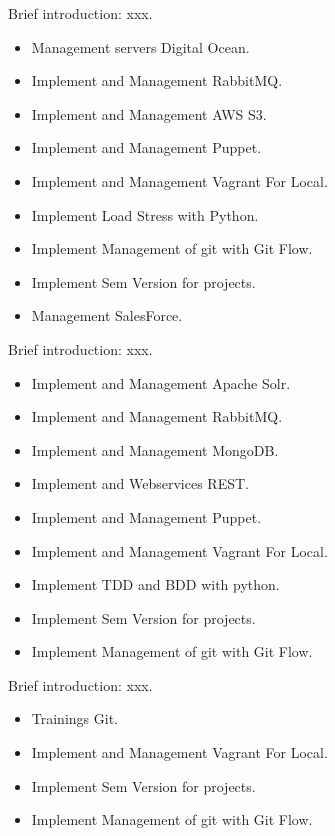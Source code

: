 \documentclass{resume}
\begin{document}
Brief introduction: xxx.
\begin{itemize}
  \item Management servers Digital Ocean.
  \item Implement and Management RabbitMQ.
  \item Implement and Management AWS S3.
  \item Implement and Management Puppet.
  \item Implement and Management Vagrant For Local.
  \item Implement Load Stress with Python.
  \item Implement Management of git with Git Flow.
  \item Implement Sem Version for projects.
  \item Management SalesForce.
\end{itemize}

Brief introduction: xxx.
\begin{itemize}
  \item Implement and Management Apache Solr.
  \item Implement and Management RabbitMQ.
  \item Implement and Management MongoDB.
  \item Implement and Webservices REST.
  \item Implement and Management Puppet.
  \item Implement and Management Vagrant For Local.
  \item Implement TDD and BDD with python.
  \item Implement Sem Version for projects.
  \item Implement Management of git with Git Flow.
\end{itemize}

Brief introduction: xxx.
\begin{itemize}
  \item Trainings Git.
  \item Implement and Management Vagrant For Local.
  \item Implement Sem Version for projects.
  \item Implement Management of git with Git Flow.
\end{itemize}
\end{document}
